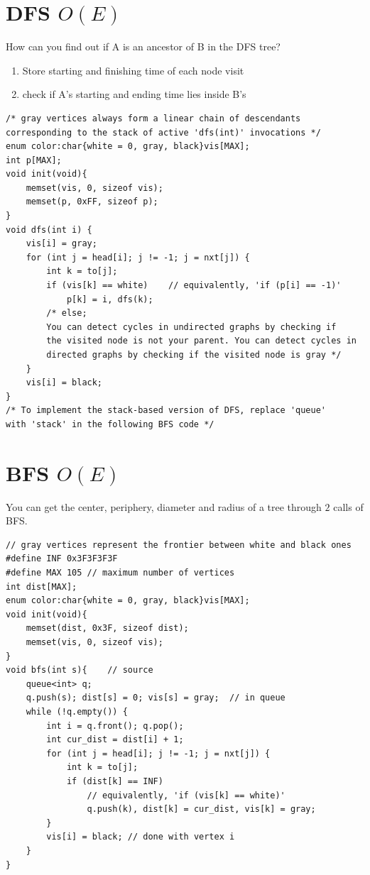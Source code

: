 \documentclass[12pt]{book}
\begin{document}
\section{DFS $O(E)$}
How can you find out if A is an ancestor of B in the DFS tree?
\begin{enumerate}[label = \roman*.]
\item Store starting and finishing time of each node visit
\item check if A's starting and ending time lies inside B's
\end{enumerate}
\begin{verbatim}
/* gray vertices always form a linear chain of descendants
corresponding to the stack of active 'dfs(int)' invocations */
enum color:char{white = 0, gray, black}vis[MAX];
int p[MAX];
void init(void){
	memset(vis, 0, sizeof vis);
	memset(p, 0xFF, sizeof p);
}
void dfs(int i) {
	vis[i] = gray;
	for (int j = head[i]; j != -1; j = nxt[j]) {
		int k = to[j];
		if (vis[k] == white)	// equivalently, 'if (p[i] == -1)'
			p[k] = i, dfs(k);
		/* else;
		You can detect cycles in undirected graphs by checking if
		the visited node is not your parent. You can detect cycles in
		directed graphs by checking if the visited node is gray */
	}
	vis[i] = black;
}
/* To implement the stack-based version of DFS, replace 'queue'
with 'stack' in the following BFS code */
\end{verbatim}
\section{BFS $O(E)$}
You can get the center, periphery, diameter and radius of a tree through $2$ calls of BFS.
\begin{verbatim}
// gray vertices represent the frontier between white and black ones
#define INF 0x3F3F3F3F
#define MAX 105	// maximum number of vertices
int dist[MAX];
enum color:char{white = 0, gray, black}vis[MAX];
void init(void){
	memset(dist, 0x3F, sizeof dist);
	memset(vis, 0, sizeof vis);
}
void bfs(int s){	// source
	queue<int> q;
	q.push(s); dist[s] = 0; vis[s] = gray;	// in queue
	while (!q.empty()) {
		int i = q.front(); q.pop();
		int cur_dist = dist[i] + 1;
		for (int j = head[i]; j != -1; j = nxt[j]) {
			int k = to[j];
			if (dist[k] == INF)
				// equivalently, 'if (vis[k] == white)'
				q.push(k), dist[k] = cur_dist, vis[k] = gray;
		}
		vis[i] = black;	// done with vertex i
	}
}
\end{verbatim}
\end{document}
